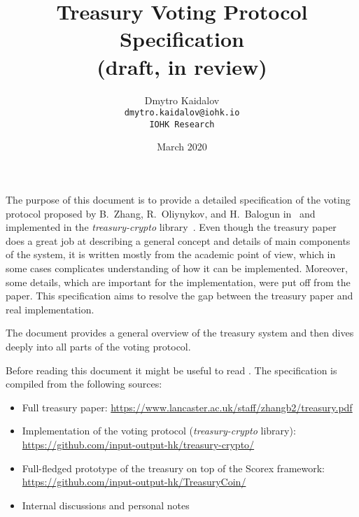 \documentclass{article}
\title{Treasury Voting Protocol Specification\\
(draft, in review)}
\author{Dmytro Kaidalov\\
    \texttt{dmytro.kaidalov@iohk.io}\\
    \texttt{IOHK Research}}
\date{March 2020}
\begin{document}
\maketitle
\thispagestyle{empty}

The purpose of this document is to provide a detailed specification of the voting protocol proposed by B.~Zhang, R.~Oliynykov, and H.~Balogun in~\cite{ZOB18} and implemented in the \textit{treasury-crypto} library~\cite{treasury-crypto}. Even though the treasury paper~\cite{ZOB18} does a great job at describing a general concept and details of main components of the system, it is written mostly from the academic point of view, which in some cases complicates understanding of how it can be implemented. Moreover, some details, which are important for the implementation, were put off from the paper. This specification aims to resolve the gap between the treasury paper and real implementation.

The document provides a general overview of the treasury system and then dives deeply into all parts of the voting protocol.

Before reading this document it might be useful to read \cite{ZOB18}. 
The specification is compiled from the following sources:
\begin{itemize}
    \item Full treasury paper: \url{https://www.lancaster.ac.uk/staff/zhangb2/treasury.pdf} \cite{ZOB18}
    \item Implementation of the voting protocol (\textit{treasury-crypto} library):\\ \url{https://github.com/input-output-hk/treasury-crypto/} \cite{treasury-crypto}
    \item Full-fledged prototype of the treasury on top of the Scorex framework:\\
    \url{https://github.com/input-output-hk/TreasuryCoin/} \cite{treasurycoin}
    \item Internal discussions and personal notes
\end{itemize}





\end{document}
